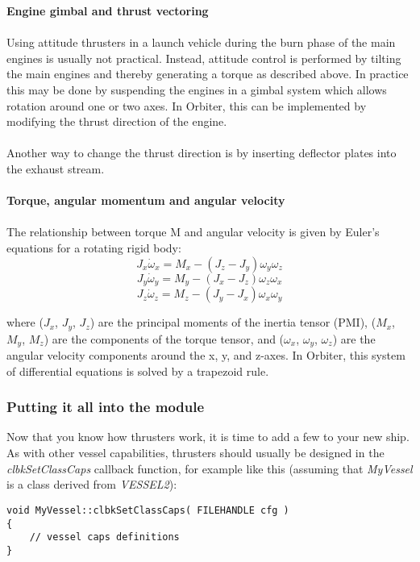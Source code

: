 \documentclass[Orbiter Developer Manual.tex]{subfiles}
\begin{document}
\noindent
\textbf{Engine gimbal and thrust vectoring}\\
\\
Using attitude thrusters in a launch vehicle during the burn phase of the main engines is usually not practical. Instead, attitude control is performed by tilting the main engines and thereby generating a torque as described above. In practice this may be done by suspending the engines in a gimbal system which allows rotation around one or two axes. In Orbiter, this can be implemented by modifying the thrust direction of the engine.\\
\\
Another way to change the thrust direction is by inserting deflector plates into the exhaust stream.\\
\\
\textbf{Torque, angular momentum and angular velocity}\\
\\
The relationship between torque M and angular velocity is given by Euler’s equations for a rotating rigid body:
\[ J_{x}\dot{\omega}_{x} = M_{x} - (J_{z} - J_{y})\omega_{y}\omega_{z} \]
\[ J_{y}\dot{\omega}_{y} = M_{y} - (J_{x} - J_{z})\omega_{z}\omega_{x} \]
\[ J_{z}\dot{\omega}_{z} = M_{z} - (J_{y} - J_{x})\omega_{x}\omega_{y} \]

\noindent
where ($J_{x}$, $J_{y}$, $J_{z}$) are the principal moments of the inertia tensor (PMI), ($M_{x}$, $M_{y}$, $M_{z}$) are the components of the torque tensor, and ($\omega_{x}$, $\omega_{y}$, $\omega_{z}$) are the angular velocity components around the x, y, and z-axes. In Orbiter, this system of differential equations is solved by a trapezoid rule.


\subsubsection{Putting it all into the module}
Now that you know how thrusters work, it is time to add a few to your new ship. As with other vessel capabilities, thrusters should usually be designed in the \textit{clbkSetClassCaps} callback function, for example like this (assuming that \textit{MyVessel} is a class derived from \textit{VESSEL2}):

\begin{lstlisting}
void MyVessel::clbkSetClassCaps( FILEHANDLE cfg )
{
	// vessel caps definitions
}
\end{lstlisting}
\end{document}
